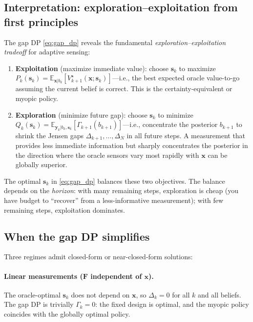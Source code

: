 \documentclass[11pt,a4paper]{article}
\newcommand{\E}{\mathbb{E}}
\begin{document}
\subsection{Interpretation: exploration--exploitation from first principles}

The gap DP \eqref{eq:gap_dp} reveals the fundamental \emph{exploration--exploitation tradeoff} for adaptive sensing:

\begin{enumerate}
  \item \textbf{Exploitation} (maximize immediate value): choose $\bm{s}_k$ to maximize $P_k(\bm{s}_k) = \E_{\bm{x}|b_k}[V_{k+1}^\star(\bm{x};\bm{s}_k)]$---i.e., the best expected oracle value-to-go assuming the current belief is correct.  This is the certainty-equivalent or myopic policy.

  \item \textbf{Exploration} (minimize future gap): choose $\bm{s}_k$ to minimize $Q_k(\bm{s}_k) = \E_{\bm{y}_k|b_k,\bm{s}_k}[\Gamma_{k+1}(b_{k+1})]$---i.e., concentrate the posterior $b_{k+1}$ to shrink the Jensen gaps $\Delta_{k+1}, \ldots, \Delta_N$ in all future steps.  A measurement that provides less immediate information but sharply concentrates the posterior in the direction where the oracle sensors vary most rapidly with $\bm{x}$ can be globally superior.
\end{enumerate}

The optimal $\bm{s}_k$ in \eqref{eq:gap_dp} balances these two objectives.  The balance depends on the \emph{horizon}: with many remaining steps, exploration is cheap (you have budget to ``recover'' from a less-informative measurement); with few remaining steps, exploitation dominates.

\subsection{When the gap DP simplifies}

Three regimes admit closed-form or near-closed-form solutions:

\paragraph{Linear measurements ($\bm{F}$ independent of $\bm{x}$).}
The oracle-optimal $\bm{s}_k$ does not depend on $\bm{x}$, so $\Delta_k = 0$ for all $k$ and all beliefs.  The gap DP is trivially $\Gamma_k = 0$: the fixed design is optimal, and the myopic policy coincides with the globally optimal policy.
\end{document}
